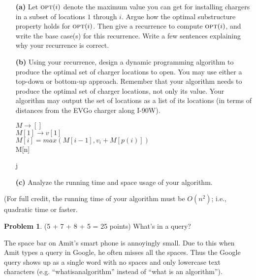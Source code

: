 \documentclass[11pt]{article}
\newcommand{\opt}{\mbox{\textsc{opt}}}
\theoremstyle{definition}
\theoremstyle{theorem}
\newtheorem{prob}{Problem}
\begin{document}
\begin{itemize}
\item[{\bf (a)}] Let $\opt(i)$ denote the maximum value you can get
  for installing chargers in a subset of locations $1$ through $i$. Argue how the optimal substructure property holds for $\opt(i)$. Then give a recurrence to compute $\opt(i)$, and write the base case(s) for this recurrence.  Write a few sentences explaining why your recurrence is correct.

\item[{\bf (b)}] Using your recurrence, design a dynamic programming
  algorithm to produce the optimal set of charger locations to open.  You may use
  either a top-down or bottom-up approach.  Remember that your
  algorithm needs to produce the optimal set of charger locations, not only its
  value.  Your algorithm may output the set of locations as a list of its
  locations (in terms of distances from the EVGo charger along I-90W).

\begin{algorithm}[H]
$M \rightarrow []$ \\
$M[1] \rightarrow v[1]$ \\
 {
	 {
		$M[i] = max(M[i-1], v_i + M[p(i)])$\\
	}
	\Return M[n]
}

 {
	 {
		 {
			\Return j
		}
	}
}

\end{algorithm}

\item[{\bf (c)}]
  Analyze the running time and space usage of your algorithm.

\end{itemize}
(For full credit, the running time of your algorithm must be $O(n^2)$;
i.e., quadratic time or faster.  

\begin{prob}
(5 + 7 + 8 + 5 = 25 points) What's in a query?
\end{prob}

The space bar on Amit's smart phone is annoyingly small. Due to this when Amit types a query in Google, he often misses all the spaces. Thus the Google query shows up as a single word with no spaces and only lowercase text characters (e.g. ``whatisanalgorithm'' instead of ``what is an algorithm''). 
\end{document}
